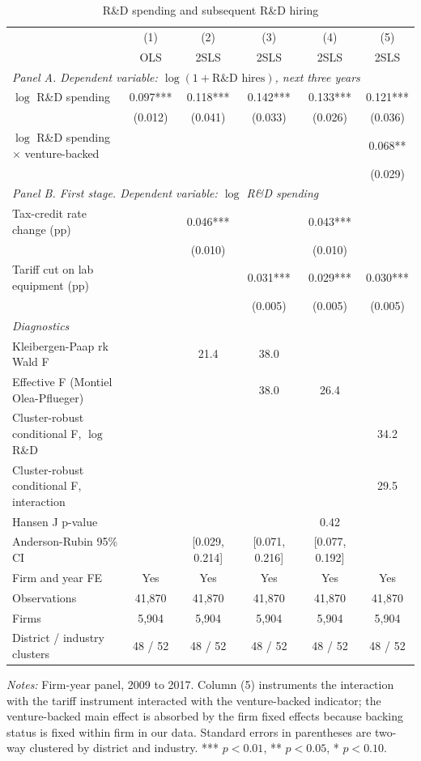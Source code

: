 \documentclass[11pt]{article}
\begin{document}
\begin{table}[htbp]
\centering
\begin{threeparttable}
\caption{R\&D spending and subsequent R\&D hiring}
\label{tab:rd}
\footnotesize
\setlength{\tabcolsep}{4pt}
\begin{tabular}{lccccc}
\toprule
 & (1) & (2) & (3) & (4) & (5) \\
 & OLS & 2SLS & 2SLS & 2SLS & 2SLS \\
\midrule
\multicolumn{6}{l}{\textit{Panel A. Dependent variable: $\log(1 + \text{R\&D hires})$, next three years}} \\
$\log$ R\&D spending & 0.097*** & 0.118*** & 0.142*** & 0.133*** & 0.121*** \\
 & (0.012) & (0.041) & (0.033) & (0.026) & (0.036) \\
$\log$ R\&D spending $\times$ venture-backed & & & & & 0.068** \\
 & & & & & (0.029) \\[0.5em]
\multicolumn{6}{l}{\textit{Panel B. First stage. Dependent variable: $\log$ R\&D spending}} \\
Tax-credit rate change (pp) & & 0.046*** & & 0.043*** & \\
 & & (0.010) & & (0.010) & \\
Tariff cut on lab equipment (pp) & & & 0.031*** & 0.029*** & 0.030*** \\
 & & & (0.005) & (0.005) & (0.005) \\[0.5em]
\multicolumn{6}{l}{\textit{Diagnostics}} \\
Kleibergen-Paap rk Wald F & & 21.4 & 38.0 & & \\
Effective F (Montiel Olea-Pflueger) & & & 38.0 & 26.4 & \\
Cluster-robust conditional F, $\log$ R\&D & & & & & 34.2 \\
Cluster-robust conditional F, interaction & & & & & 29.5 \\
Hansen J p-value & & & & 0.42 & \\
Anderson-Rubin 95\% CI & & [0.029, 0.214] & [0.071, 0.216] & [0.077, 0.192] & \\[0.5em]
Firm and year FE & Yes & Yes & Yes & Yes & Yes \\
Observations & 41,870 & 41,870 & 41,870 & 41,870 & 41,870 \\
Firms & 5,904 & 5,904 & 5,904 & 5,904 & 5,904 \\
District / industry clusters & 48 / 52 & 48 / 52 & 48 / 52 & 48 / 52 & 48 / 52 \\
\bottomrule
\end{tabular}
\begin{tablenotes}\footnotesize
\item \textit{Notes:} Firm-year panel, 2009 to 2017. Column (5) instruments the interaction with the tariff instrument interacted with the venture-backed indicator; the venture-backed main effect is absorbed by the firm fixed effects because backing status is fixed within firm in our data. Standard errors in parentheses are two-way clustered by district and industry. *** $p<0.01$, ** $p<0.05$, * $p<0.10$.
\end{tablenotes}
\end{threeparttable}
\end{table}
\end{document}
